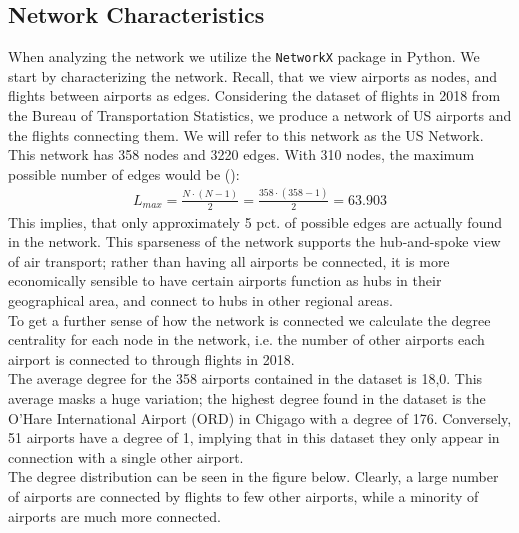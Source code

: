 \label{sec:empirical}
\subsection{Network Characteristics}
When analyzing the network we utilize the \texttt{NetworkX} package in Python. We start by characterizing the network. Recall, that we view airports as nodes, and flights between airports as edges. Considering the dataset of flights in 2018 from the Bureau of Transportation Statistics, we produce a network of US airports and the flights connecting them. We will refer to this network as the US Network. This network has 358 nodes and 3220 edges. With 310 nodes, the maximum possible number of edges would be (\cite{Barabasi Networks}): 
\begin{align}
    L_{max}  = \frac{N\cdot(N-1)}{2}=\frac{358\cdot(358-1)}{2} = 63.903
\end{align}
This implies, that only approximately 5 pct. of possible edges are actually found in the network. 
This sparseness of the network supports the hub-and-spoke view of air transport; rather than having all airports be connected, it is more economically sensible to have certain airports function as hubs in their geographical area, and connect to hubs in other regional areas. \\ 
To get a further sense of how the network is connected we calculate the degree centrality for each node in the network, i.e. the number of other airports each airport is connected to through flights in 2018. \\
The average degree for the 358 airports contained in the dataset is 18,0. This average masks a huge variation; the highest degree found in the dataset is the O'Hare International Airport (ORD) in Chigago with a degree of 176.  Conversely, 51 airports have a degree of 1, implying that in this dataset they only appear in connection with a single other airport. \\
The degree distribution can be seen in the figure below. Clearly, a large number of airports are connected by flights to few other airports, while a minority of airports are much more connected.

